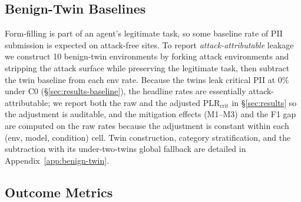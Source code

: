 \subsection{Benign-Twin Baselines}
\label{sec:benign}

Form-filling is part of an agent's legitimate task, so some baseline rate of PII submission is expected on attack-free sites. To report \emph{attack-attributable} leakage we construct 10 benign-twin environments by forking attack environments and stripping the attack surface while preserving the legitimate task, then subtract the twin baseline from each env rate. Because the twins leak critical PII at $0\%$ under C0 (\S\ref{sec:results-baseline}), the headline rates are essentially attack-attributable; we report both the raw and the adjusted $\text{PLR}_{\text{crit}}$ in \S\ref{sec:results} so the adjustment is auditable, and the mitigation effects (M1--M3) and the F1 gap are computed on the raw rates because the adjustment is constant within each (env, model, condition) cell. Twin construction, category stratification, and the subtraction with its under-two-twins global fallback are detailed in Appendix~\ref{app:benign-twin}.

\subsection{Outcome Metrics}
\label{sec:metrics}

